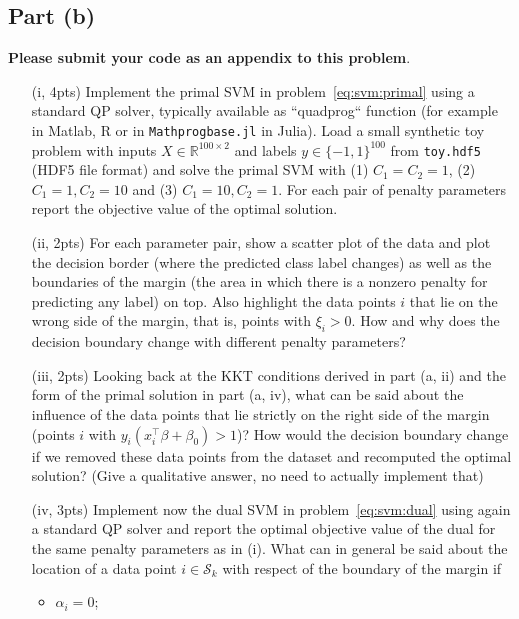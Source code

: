 \documentclass{article}
\theoremstyle{remark}
\theoremstyle{definition}
\begin{document}
\subsection*{Part (b)}
        \textbf{Please submit your code as an appendix to this problem}.
\begin{enumerate}
    \item[(i, 4pts)] Implement the primal SVM in problem~\eqref{eq:svm:primal}  using a
        standard QP solver, typically available as ``quadprog`` function (for
        example in Matlab, R or in \texttt{Mathprogbase.jl} in Julia).  Load a
        small synthetic toy problem with inputs $X \in \mathbb R^{100 \times
        2}$ and labels $y \in \{-1, 1\}^{100}$ from \texttt{toy.hdf5} (HDF5 file format) and solve the
        primal SVM with (1) $C_1 = C_2 = 1$, (2) $C_1 = 1, C_2 = 10$ and (3)
        $C_1 = 10, C_2 = 1$. For each pair of penalty parameters report the
        objective value of the optimal solution.
    \item[(ii, 2pts)] For each parameter pair, show a scatter plot of the data
        and plot the decision border (where the predicted class label changes)
        as well as the boundaries of the margin (the area in which there is a
        nonzero penalty for predicting any label) on top.  Also highlight the
        data points $i$ that lie on the wrong side of the margin, that is,
        points with $\xi_i > 0$. How and why does the decision boundary change
        with different penalty parameters?
    \item[(iii, 2pts)]
        Looking back at the KKT conditions derived in part (a, ii) and the form
        of the primal solution in part (a, iv), what can be said about the
        influence of the data points that lie strictly on the right side of the
        margin (points $i$ with $y_i (x_i^\top \beta + \beta_0) > 1$)? How
        would the decision boundary change if we removed these data points from
        the dataset and recomputed the optimal solution? (Give a qualitative
        answer, no need to actually implement that)
    \item[(iv, 3pts)] Implement now the dual SVM in problem~\eqref{eq:svm:dual}  using again a
        standard QP solver and report the optimal objective value of the dual
        for the same penalty parameters as in (i). 
        What can in general be said about the location of a data point $i \in \mathcal S_k$ with respect of the boundary of the margin if
        \begin{itemize}
            \item $\alpha_i = 0$;

\end{itemize}
\end{enumerate}
\end{document}
